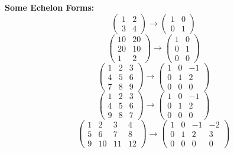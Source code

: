 \documentclass[11pt]{article}
\begin{document}
{\noindent\bf\color{red} Some Echelon Forms:}
$$\left(\begin{array}{rr}
1 & 2 \\
3 & 4
\end{array}\right) \longrightarrow \left(\begin{array}{rr}
1 & 0 \\
0 & 1
\end{array}\right)$$
$$\left(\begin{array}{rr}
10 & 20 \\
20 & 10 \\
1 & 2
\end{array}\right) \longrightarrow \left(\begin{array}{rr}
1 & 0 \\
0 & 1 \\
0 & 0
\end{array}\right)$$
$$\left(\begin{array}{rrr}
1 & 2 & 3 \\
4 & 5 & 6 \\
7 & 8 & 9
\end{array}\right) \longrightarrow \left(\begin{array}{rrr}
1 & 0 & -1 \\
0 & 1 & 2 \\
0 & 0 & 0
\end{array}\right)$$
$$\left(\begin{array}{rrr}
1 & 2 & 3 \\
4 & 5 & 6 \\
9 & 8 & 7
\end{array}\right) \longrightarrow \left(\begin{array}{rrr}
1 & 0 & -1 \\
0 & 1 & 2 \\
0 & 0 & 0
\end{array}\right)$$
$$\left(\begin{array}{rrrr}
1 & 2 & 3 & 4 \\
5 & 6 & 7 & 8 \\
9 & 10 & 11 & 12
\end{array}\right) \longrightarrow \left(\begin{array}{rrrr}
1 & 0 & -1 & -2 \\
0 & 1 & 2 & 3 \\
0 & 0 & 0 & 0
\end{array}\right)$$
\end{document}
